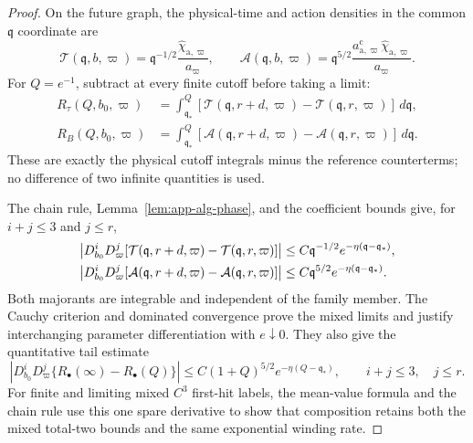 \documentclass[11pt]{amsart}
\numberwithin{equation}{section}
\theoremstyle{definition}
\theoremstyle{remark}
\begin{document}
\begin{proof}
On the future graph, the physical-time and action densities in the common
$\mathfrak q$ coordinate are
\begin{equation}\label{eq:app-alg-q-densities}
 \mathcal T(\mathfrak q,b,\varpi)
 =\mathfrak q^{-1/2}\frac{\widehat\chi_{\mathrm a,\varpi}}
       {a_\varpi},
 \qquad
 \mathcal A(\mathfrak q,b,\varpi)
 =\mathfrak q^{5/2}\frac{a_{\mathrm a,\varpi}^{\mathrm c}
       \widehat\chi_{\mathrm a,\varpi}}{a_\varpi}.
\end{equation}
For $Q=e^{-1}$, subtract at every finite cutoff before taking a limit:
\begin{align}
 R_\tau(Q,b_0,\varpi)
 &=\int_{\mathfrak q_*}^{Q}
   [\mathcal T(\mathfrak q,r+d,\varpi)
       -\mathcal T(\mathfrak q,r,\varpi)]\,d\mathfrak q,
 \label{eq:app-alg-time-cutoff-difference}\\
 R_B(Q,b_0,\varpi)
 &=\int_{\mathfrak q_*}^{Q}
   [\mathcal A(\mathfrak q,r+d,\varpi)
       -\mathcal A(\mathfrak q,r,\varpi)]\,d\mathfrak q.
 \label{eq:app-alg-action-cutoff-difference}
\end{align}
These are exactly the physical cutoff integrals minus the reference
counterterms; no difference of two infinite quantities is used.

The chain rule, Lemma~\ref{lem:app-alg-phase}, and the coefficient bounds
give, for $i+j\le3$ and $j\le r$,
\begin{align}
 \left|D_{b_0}^iD_\varpi^j
 [\mathcal T(\mathfrak q,r+d,\varpi)
       -\mathcal T(\mathfrak q,r,\varpi)]\right|
 &\le C\mathfrak q^{-1/2}
       e^{-\eta(\mathfrak q-\mathfrak q_*)},\notag\\
 \left|D_{b_0}^iD_\varpi^j
 [\mathcal A(\mathfrak q,r+d,\varpi)
       -\mathcal A(\mathfrak q,r,\varpi)]\right|
 &\le C\mathfrak q^{5/2}
       e^{-\eta(\mathfrak q-\mathfrak q_*)}.
 \label{eq:app-alg-density-majorants}
\end{align}
Both majorants are integrable and independent of the family member.  The
Cauchy criterion and dominated convergence prove the mixed limits and
justify interchanging parameter differentiation with $e\downarrow0$.
They also give the quantitative tail estimate
\begin{equation}\label{eq:app-alg-cutoff-tail}
 \left|D_{b_0}^iD_\varpi^j
   \{R_\bullet(\infty)-R_\bullet(Q)\}\right|
 \le C(1+Q)^{5/2}e^{-\eta(Q-\mathfrak q_*)},
 \qquad i+j\le3,\quad j\le r.
\end{equation}
For finite and limiting mixed $C^3$ first-hit labels, the mean-value formula
and the chain rule use this one spare derivative to show that composition
retains both the mixed total-two bounds and the same exponential winding
rate.
\end{proof}
\end{document}
